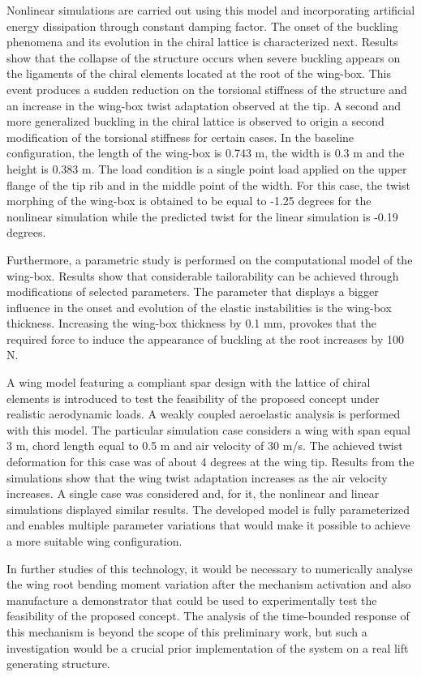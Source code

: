 Nonlinear simulations are carried out using this model and incorporating artificial energy dissipation through constant damping factor. The onset of the buckling phenomena and its evolution in the chiral lattice is characterized next. Results show that the collapse of the structure occurs when severe buckling appears on the ligaments of the chiral elements located at the root of the wing-box. This event produces a sudden reduction on the torsional stiffness of the structure and an increase in the wing-box twist adaptation observed at the tip. A second and more generalized buckling in the chiral lattice is observed to origin a second modification of the torsional stiffness for certain cases. In the baseline configuration, the length of the wing-box is 0.743 m, the width is 0.3 m and the height is 0.383 m. The load condition is a single point load applied on the upper flange of the tip rib and in the middle point of the width. For this case, the twist morphing of the wing-box is obtained to be equal to -1.25 degrees for the nonlinear simulation while the predicted twist for the linear simulation is -0.19 degrees.

Furthermore, a parametric study is performed on the computational model of the wing-box. Results show that considerable tailorability can be achieved through modifications of selected parameters. The parameter that displays a bigger influence in the onset and evolution of the elastic instabilities is the wing-box thickness. Increasing the wing-box thickness by 0.1 mm, provokes that the required force to induce the appearance of buckling at the root increases by 100 N. 

A wing model featuring a compliant spar design with the lattice of chiral elements is introduced to test the feasibility of the proposed concept under realistic aerodynamic loads. A weakly coupled aeroelastic analysis is performed with this model. The particular simulation case considers a wing with span equal 3 m, chord length equal to 0.5 m and air velocity of 30 m/s. The achieved twist deformation for this case was of about 4 degrees at the wing tip. Results from the simulations show that the wing twist adaptation increases as the air velocity increases. A single case was considered and, for it, the nonlinear and linear simulations displayed similar results. The developed model is fully parameterized and enables multiple parameter variations that would make it possible to achieve a more suitable wing configuration.  

In further studies of this technology, it would be necessary to numerically analyse the wing root bending moment variation after the mechanism activation and also manufacture a demonstrator that could be used to experimentally test the feasibility of the proposed concept. The analysis of the time-bounded response of this mechanism is beyond the scope of this preliminary work, but such a investigation would be a crucial prior implementation of the system on a real lift generating structure.

